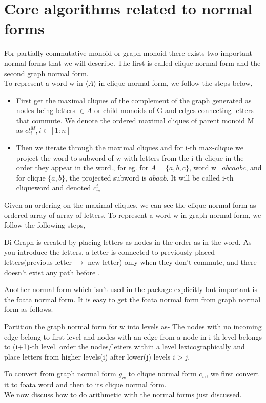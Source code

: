 \section{Core algorithms related to normal forms}
For partially-commutative monoid or graph monoid there exists two important normal forms that we will describe. The first is called clique normal form and the second graph normal form. \\ To represent a word w in $\langle A \rangle$ in clique-normal form, we follow the steps below,
\begin{itemize}
    \item First get the maximal cliques of the complement of the graph generated as nodes being letters $\in A$ or child monoids of G and edges connecting letters that commute. We denote the ordered maximal cliques of parent monoid M as $cl_i^M, i \in [1:n]$
    \item Then we iterate through the maximal cliques and for i-th max-clique we project the word to subword of w with letters from the i-th clique in the order they appear in the word., for eg. for $A=\{a,b,c\}$, word w=$abcaabc$, and for clique $\{a,b\}$, the projected subword is $abaab$. It will be called i-th cliqueword and denoted $c^i_w$
\end{itemize}
Given an ordering on the maximal cliques, we can see the clique normal form as ordered array of array of letters.
 To represent a word w in graph normal form, we follow the following steps,
 \begin{outline}
    \1 Di-Graph is created by placing letters as nodes in the order as in the word.
    \1 As you introduce the letters, a letter is connected to previously placed letters(previous letter $\rightarrow$ new letter) only when they don't commute, and there doesn't exist any path before .
\end{outline}
Another normal form which isn't used in the package explicitly but important is the foata normal form. It is easy to get the foata normal form from graph normal form as follows. 
\begin{outline}
    \1 Partition the graph normal form for w into levels as- 
    \2 The nodes with no incoming edge belong to first level and nodes with an edge from a node in i-th level belongs to (i+1)-th level.
    \1 order the nodes/letters within a level lexicographically and place letters from higher levels(i) after lower(j) levels $i>j$.
\end{outline}
To convert from graph normal form $g_w$ to clique normal form $c_w$, we first convert it to foata word and then to its clique normal form. 
\\
We now discuss how to do arithmetic with the normal forms just discussed.

